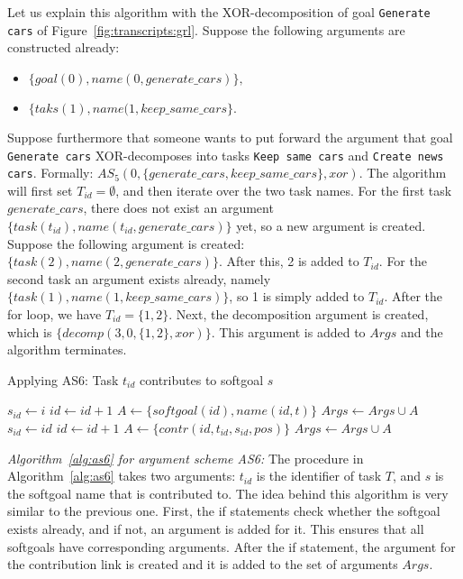 Let us explain this algorithm with the XOR-decomposition of goal \texttt{Generate cars} of Figure~\ref{fig:transcripts:grl}. Suppose the following arguments are constructed already:
\begin{itemize}
\item $\{goal(0),name(0,generate\_cars)\},$
\item $\{taks(1),name(1,keep\_same\_cars\}.$
\end{itemize}
Suppose furthermore that someone wants to put forward the argument that goal \texttt{Generate cars} XOR-decomposes into tasks \texttt{Keep same cars} and \texttt{Create news cars}. Formally: $AS_5(0,\{generate\_cars,keep\_same\_cars\},xor)$. The algorithm will first set $T_{id}=\emptyset$, and then iterate over the two task names. For the first task $generate\_cars$, there does not exist an argument $\{task(t_{id}),name(t_{id},generate\_cars)\}$ yet, so a  new argument is created. Suppose the following argument is created: $\{task(2),name(2,generate\_cars)\}.$ After this, 2 is added to $T_{id}$. For the second task an argument exists already, namely $\{task(1),name(1,keep\_same\_cars)\}$, so 1 is simply added to $T_{id}$. After the for loop, we have $T_{id}=\{1,2\}$. Next, the decomposition argument is created, which is $\{decomp(3,0,\{1,2\},xor)\}$. This argument is added to $Args$ and the algorithm terminates.

\begin{algorithm}[h]
  \caption{Applying AS6: Task $t_{id}$ contributes to softgoal $s$}\label{alg:as6}
  \begin{algorithmic}[1]
        \State $s_{id} \gets i$
    \Else
      \State $id\gets id+1$
      \State $A \gets \{softgoal(id),name(id,t)\}$
      \State $Args \gets Args\cup A$
      \State $s_{id} \gets id$
    \EndIf
    \State $id\gets id+1$
    \State $A\gets \{contr(id, t_{id}, s_{id}, pos)\}$
    \State $Args \gets Args\cup A$
    \EndProcedure
  \end{algorithmic}
\end{algorithm}

\emph{Algorithm~\ref{alg:as6} for argument scheme AS6:} The procedure in Algorithm~\ref{alg:as6} takes two arguments: $t_{id}$ is the identifier of task $T$, and $s$ is the softgoal name that is contributed to. The idea behind this algorithm is very similar to the previous one. First, the if statements check whether the softgoal exists already, and if not, an argument is added for it. This ensures that all softgoals have corresponding arguments. After the if statement, the argument for the contribution link is created and it is added to the set of arguments $Args$. 

